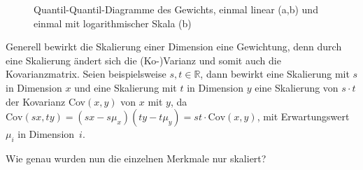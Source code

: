  \begin{figure}
  \qquad
  \qquad
  
  \caption{ Quantil-Quantil-Diagramme des Gewichts, einmal linear (a,b) und einmal mit logarithmischer Skala (b)}
  \label{qqdiagrams_weight}
 \end{figure}
 
 Generell bewirkt die Skalierung einer Dimension eine Gewichtung, denn durch eine Skalierung ändert sich die (Ko-)Varianz und somit auch die Kovarianzmatrix. Seien beispielsweise $s,t \in \mathbb{R}$, dann bewirkt eine Skalierung mit $s$ in Dimension $x$ und eine Skalierung mit $t$ in Dimension $y$ eine Skalierung von $s \cdot t$ der Kovarianz Cov$(x,y)$ von $x$ mit $y$, da $\mathrm{Cov}(sx, ty) = (sx - s\mu_x) (ty - t\mu_y) = st \cdot \mathrm{Cov}(x,y)$, mit Erwartungswert $\mu_i$ in \mbox{Dimension $i$}.
 
 Wie genau wurden nun die einzelnen Merkmale nur skaliert?
 
